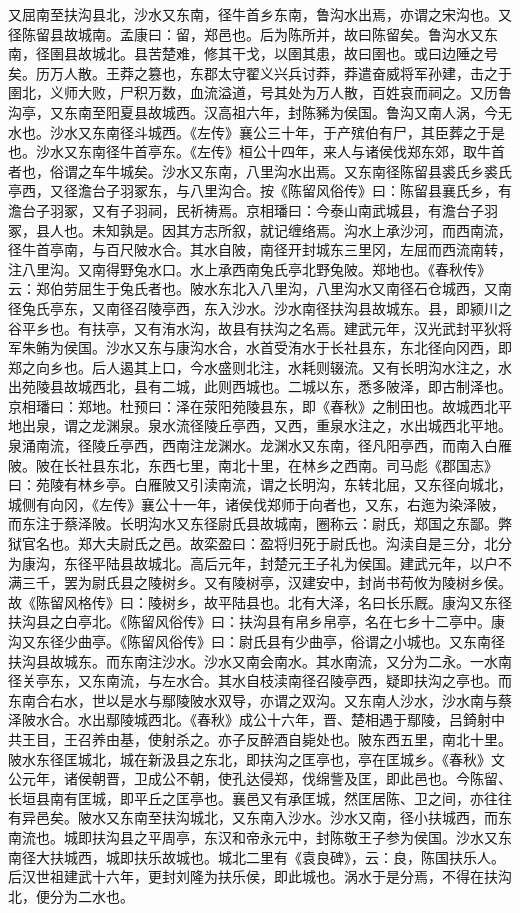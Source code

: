 \documentclass[12pt,UTF8]{ctexbook}
\begin{document}
又屈南至扶沟县北，沙水又东南，径牛首乡东南，鲁沟水出焉，亦谓之宋沟也。又径陈留县故城南。孟康曰：留，郑邑也。后为陈所并，故曰陈留矣。鲁沟水又东南，径圉县故城北。县苦楚难，修其干戈，以圉其患，故曰圉也。或曰边陲之号矣。历万人散。王莽之篡也，东郡太守翟义兴兵讨莽，莽遣奋威将军孙建，击之于圉北，义师大败，尸积万数，血流溢道，号其处为万人散，百姓哀而祠之。又历鲁沟亭，又东南至阳夏县故城西。汉高祖六年，封陈豨为侯国。鲁沟又南人涡，今无水也。沙水又东南径斗城西。《左传》襄公三十年，于产殡伯有尸，其臣葬之于是也。沙水又东南径牛首亭东。《左传》桓公十四年，来人与诸侯伐郑东郊，取牛首者也，俗谓之车牛城矣。沙水又东南，八里沟水出焉。又东南径陈留县裘氏乡裘氏亭西，又径澹台子羽冢东，与八里沟合。按《陈留风俗传》曰：陈留县襄氏乡，有澹台子羽冢，又有子羽祠，民祈祷焉。京相璠曰：今泰山南武城县，有澹台子羽冢，县人也。未知孰是。因其方志所叙，就记缠络焉。沟水上承沙河，而西南流，径牛首亭南，与百尺陂水合。其水自陂，南径开封城东三里冈，左屈而西流南转，注八里沟。又南得野兔水口。水上承西南兔氏亭北野兔陂。郑地也。《春秋传》云：郑伯劳屈生于兔氏者也。陂水东北入八里沟，八里沟水又南径石仓城西，又南径兔氏亭东，又南径召陵亭西，东入沙水。沙水南径扶沟县故城东。县，即颍川之谷平乡也。有扶亭，又有洧水沟，故县有扶沟之名焉。建武元年，汉光武封平狄将军朱鲔为侯国。沙水又东与康沟水合，水首受洧水于长社县东，东北径向冈西，即郑之向乡也。后人遏其上口，今水盛则北注，水耗则辍流。又有长明沟水注之，水出苑陵县故城西北，县有二城，此则西城也。二城以东，悉多陂泽，即古制泽也。京相璠曰：郑地。杜预曰：泽在荥阳苑陵县东，即《春秋》之制田也。故城西北平地出泉，谓之龙渊泉。泉水流径陵丘亭西，又西，重泉水注之，水出城西北平地。泉涌南流，径陵丘亭西，西南注龙渊水。龙渊水又东南，径凡阳亭西，而南入白雁陂。陂在长社县东北，东西七里，南北十里，在林乡之西南。司马彪《郡国志》曰：苑陵有林乡亭。白雁陂又引渎南流，谓之长明沟，东转北屈，又东径向城北，城侧有向冈，《左传》襄公十一年，诸侯伐郑师于向者也，又东，右迤为染泽陂，而东注于蔡泽陂。长明沟水又东径尉氏县故城南，圈称云：尉氏，郑国之东鄙。弊狱官名也。郑大夫尉氏之邑。故栾盈曰：盈将归死于尉氏也。沟渎自是三分，北分为康沟，东径平陆县故城北。高后元年，封楚元王子礼为侯国。建武元年，以户不满三千，罢为尉氏县之陵树乡。又有陵树亭，汉建安中，封尚书苟攸为陵树乡侯。故《陈留风格传》曰：陵树乡，故平陆县也。北有大泽，名曰长乐厩。康沟又东径扶沟县之白亭北。《陈留风俗传》曰：扶沟县有帛乡帛亭，名在七乡十二亭中。康沟又东径少曲亭。《陈留风俗传》曰：尉氏县有少曲亭，俗谓之小城也。又东南径扶沟县故城东。而东南注沙水。沙水又南会南水。其水南流，又分为二永。一水南径关亭东，又东南流，与左水合。其水自枝渎南径召陵亭西，疑即扶沟之亭也。而东南合右水，世以是水与鄢陵陂水双导，亦谓之双沟。又东南人沙水，沙水南与蔡泽陂水合。水出鄢陵城西北。《春秋》成公十六年，晋、楚相遇于鄢陵，吕錡射中共王目，王召养由基，使射杀之。亦子反醉酒自毙处也。陂东西五里，南北十里。陂水东径匡城北，城在新汲县之东北，即扶沟之匡亭也，亭在匡城乡。《春秋》文公元年，诸侯朝晋，卫成公不朝，使孔达侵郑，伐绵訾及匡，即此邑也。今陈留、长垣县南有匡城，即平丘之匡亭也。襄邑又有承匡城，然匡居陈、卫之间，亦往往有异邑矣。陂水又东南至扶沟城北，又东南入沙水。沙水又南，径小扶城西，而东南流也。城即扶沟县之平周亭，东汉和帝永元中，封陈敬王子参为侯国。沙水又东南径大扶城西，城即扶乐故城也。城北二里有《袁良碑》，云：良，陈国扶乐人。后汉世祖建武十六年，更封刘隆为扶乐侯，即此城也。涡水于是分焉，不得在扶沟北，便分为二水也。
\end{document}
